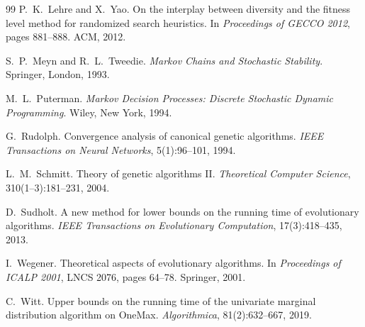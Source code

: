 \documentclass[11pt,a4paper]{article}
\begin{document}
\begin{thebibliography}{99}
P.~K.~Lehre and X.~Yao.
On the interplay between diversity and the fitness level method for
randomized search heuristics.
In \textit{Proceedings of GECCO 2012}, pages 881--888. ACM, 2012.

S.~P.~Meyn and R.~L.~Tweedie.
\textit{Markov Chains and Stochastic Stability}.
Springer, London, 1993.

M.~L.~Puterman.
\textit{Markov Decision Processes: Discrete Stochastic Dynamic Programming}.
Wiley, New York, 1994.

G.~Rudolph.
Convergence analysis of canonical genetic algorithms.
\textit{IEEE Transactions on Neural Networks}, 5(1):96--101, 1994.

L.~M.~Schmitt.
Theory of genetic algorithms II.
\textit{Theoretical Computer Science}, 310(1--3):181--231, 2004.

D.~Sudholt.
A new method for lower bounds on the running time of evolutionary algorithms.
\textit{IEEE Transactions on Evolutionary Computation}, 17(3):418--435, 2013.

I.~Wegener.
Theoretical aspects of evolutionary algorithms.
In \textit{Proceedings of ICALP 2001}, LNCS 2076, pages 64--78.
Springer, 2001.

C.~Witt.
Upper bounds on the running time of the univariate marginal distribution
algorithm on OneMax.
\textit{Algorithmica}, 81(2):632--667, 2019.

\end{thebibliography}
\end{document}
